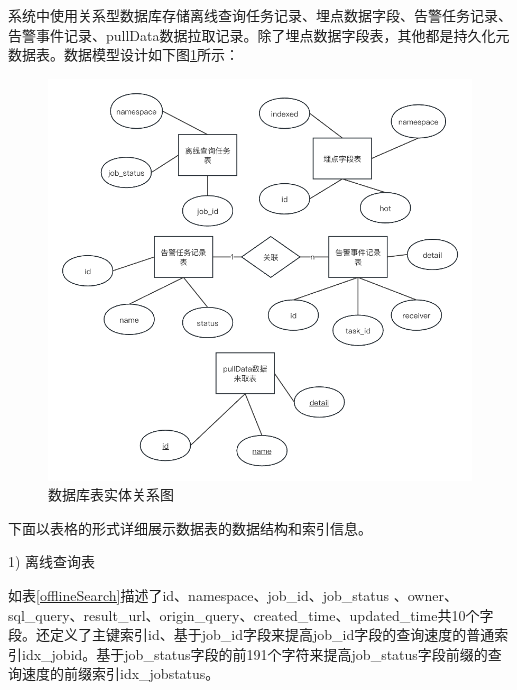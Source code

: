 系统中使用关系型数据库存储离线查询任务记录、埋点数据字段、告警任务记录、告警事件记录、pullData数据拉取记录。除了埋点数据字段表，其他都是持久化元数据表。数据模型设计如下图\ref{ergraph}所示：
\begin{figure}[htbp]
  \centering
  \includegraphics[scale=1]{figure/chapter4/数据库表实体关系图.png}
  \caption{数据库表实体关系图}\label{ergraph}
\end{figure}

下面以表格的形式详细展示数据表的数据结构和索引信息。

1)	离线查询表

如表\ref{offlineSearch}描述了id、namespace、job\_id、job\_status 、owner、sql\_query、result\_url、origin\_query、created\_time、updated\_time共10个字段。还定义了主键索引id、基于job\_id字段来提高job\_id字段的查询速度的普通索引idx\_jobid。基于job\_status字段的前191个字符来提高job\_status字段前缀的查询速度的前缀索引idx\_jobstatus。

